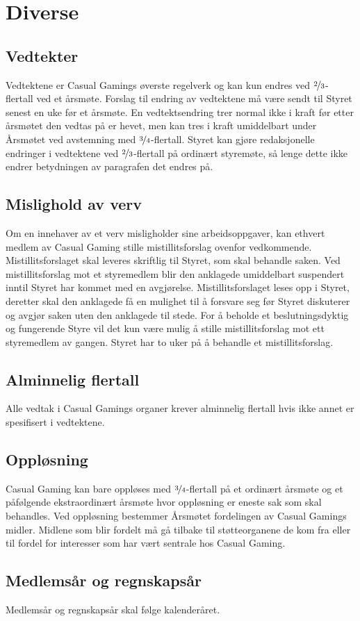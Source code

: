 \chapter{Diverse}

\section{Vedtekter}
Vedtektene er Casual Gamings øverste regelverk og kan kun endres ved $\nicefrac{2}{3}$-flertall ved et årsmøte. Forslag til endring av vedtektene må være sendt til Styret senest en uke før et årsmøte. En vedtektsendring trer normal ikke i kraft før etter årsmøtet den vedtas på er hevet, men kan tres i kraft umiddelbart under Årsmøtet ved avstemning med $\nicefrac{3}{4}$-flertall. Styret kan gjøre redaksjonelle endringer i vedtektene ved $\nicefrac{2}{3}$-flertall på ordinært styremøte, så lenge dette ikke endrer betydningen av paragrafen det endres på.

\section{Mislighold av verv}
Om en innehaver av et verv misligholder sine arbeidsoppgaver, kan ethvert medlem av Casual Gaming stille mistillitsforslag ovenfor vedkommende. Mistillitsforslaget skal leveres skriftlig til Styret, som skal behandle saken. Ved mistillitsforslag mot et styremedlem blir den anklagede umiddelbart suspendert inntil Styret har kommet med en avgjørelse. Mistillitsforslaget leses opp i Styret, deretter skal den anklagede få en mulighet til å forsvare seg før Styret diskuterer og avgjør saken uten den anklagede til stede. For å beholde et beslutningsdyktig og fungerende Styre vil det kun være mulig å stille mistillitsforslag mot ett styremedlem av gangen. Styret har to uker på å behandle et mistillitsforslag.

\section{Alminnelig flertall}
Alle vedtak i Casual Gamings organer krever alminnelig flertall hvis ikke annet er spesifisert i vedtektene.

\section{Oppløsning}
Casual Gaming kan bare oppløses med $\nicefrac{3}{4}$-flertall på et ordinært årsmøte og et påfølgende ekstraordinært årsmøte hvor oppløsning er eneste sak som skal behandles. Ved oppløsning bestemmer Årsmøtet fordelingen av Casual Gamings midler. Midlene som blir fordelt må gå tilbake til støtteorganene de kom fra eller til fordel for interesser som har vært sentrale hos Casual Gaming.

\section{Medlemsår og regnskapsår}
Medlemsår og regnskapsår skal følge kalenderåret.
